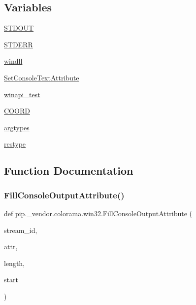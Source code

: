 \subsection*{Variables}
\begin{DoxyCompactItemize}
\item 
\hyperlink{namespacepip_1_1__vendor_1_1colorama_1_1win32_a89b0e87f6e3fbb1266ef638ba6a67747}{S\+T\+D\+O\+UT}
\item 
\hyperlink{namespacepip_1_1__vendor_1_1colorama_1_1win32_acc01cf90c02966cdaf7b20f43e030003}{S\+T\+D\+E\+RR}
\item 
\hyperlink{namespacepip_1_1__vendor_1_1colorama_1_1win32_a24cd7c52ced147d7d6118d8d7a5573da}{windll}
\item 
\hyperlink{namespacepip_1_1__vendor_1_1colorama_1_1win32_a4ab345a4d73e42a89c0f51cf34750b85}{Set\+Console\+Text\+Attribute}
\item 
\hyperlink{namespacepip_1_1__vendor_1_1colorama_1_1win32_a6b8ed90b0cfe36a2c727b0b37a3f5d84}{winapi\+\_\+test}
\item 
\hyperlink{namespacepip_1_1__vendor_1_1colorama_1_1win32_afc2e2673fd8218862c4ed0320c84855a}{C\+O\+O\+RD}
\item 
\hyperlink{namespacepip_1_1__vendor_1_1colorama_1_1win32_a079ba87fc2d1aeb156199c0289bb629d}{argtypes}
\item 
\hyperlink{namespacepip_1_1__vendor_1_1colorama_1_1win32_a98133acca9490e6845499d945c07b933}{restype}
\end{DoxyCompactItemize}


\subsection{Function Documentation}
\mbox{\label{namespacepip_1_1__vendor_1_1colorama_1_1win32_a4b50b314551c78876b1c13ad217ff870}} 
\subsubsection{\texorpdfstring{Fill\+Console\+Output\+Attribute()}{FillConsoleOutputAttribute()}}
{\footnotesize\ttfamily def pip.\+\_\+vendor.\+colorama.\+win32.\+Fill\+Console\+Output\+Attribute (\begin{DoxyParamCaption}\item[{}]{stream\+\_\+id,  }\item[{}]{attr,  }\item[{}]{length,  }\item[{}]{start }\end{DoxyParamCaption})}

